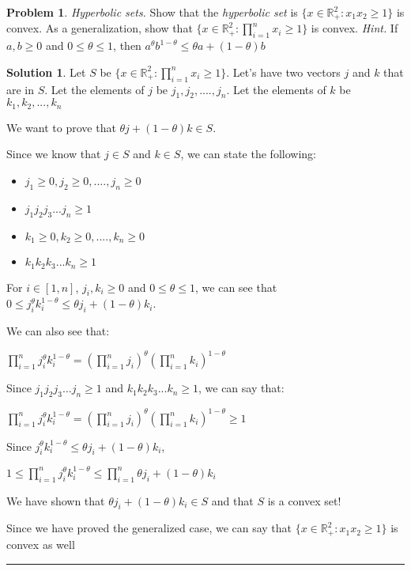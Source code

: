 \documentclass{article}
\theoremstyle{definition}
\newtheorem{problem}{Problem}
\def\fline{\rule{0.75\linewidth}{0.5pt}}
\newcommand{\finishline}{\begin{center}\fline\end{center}}
\newtheorem*{solution*}{Solution}
\newenvironment{solution}{\begin{solution*}}{{\finishline} \end{solution*}}
\begin{document}
\begin{problem}
    \textit{Hyperbolic sets.} Show that the \textit{hyperbolic set} is $\{x \in \mathbb{R}^2_+ : x_1x_2 \geq 1\}$ is convex. As a generalization, show that $\{x \in \mathbb{R}^2_+ : \prod_{i=1}^{n} x_i \geq 1\}$ is convex. \textit{Hint.} If $a, b \geq 0$ and $0 \leq \theta \leq 1$, then $a^{\theta} b^{1 - \theta} \leq \theta a + (1 - \theta) b$

    \begin{solution}
    Let $S$ be $\{x \in \mathbb{R}^2_+ : \prod_{i=1}^{n} x_i \geq 1\}$. Let's have two vectors  $j$ and $k$ that are in $S$. Let the elements of $j$ be $j_1, j_2, ...., j_n$. Let the elements of $k$ be $k_1, k_2, ..., k_n$

        We want to prove that $\theta j + (1 - \theta)k \in S$. 

        Since we know that $j \in S$ and $k \in S$, we can state the following:
        \begin{itemize}
            \item $j_1 \geq 0, j_2 \geq 0, ...., j_n \geq 0$
            \item $j_1 j_2 j_3 ... j_n \geq 1$
            \item $k_1 \geq 0, k_2 \geq 0, ...., k_n \geq 0$
            \item $k_1 k_2 k_3 ... k_n \geq 1$
        \end{itemize}

        For $i \in [1, n]$, $j_i, k_i \geq 0$ and $0 \leq \theta \leq 1$, we can see that $0 \leq j_i^{\theta} k_i^{1 - \theta} \leq \theta j_i + (1 - \theta)k_i$. 

        We can also see that: \newline 
        
        $\prod_{i=1}^{n} j_i^{\theta} k_i^{1 - \theta} =  (\prod_{i=1}^{n} j_i)^{\theta} (\prod_{i=1}^{n} k_i)^{1 - \theta}$

        Since $j_1 j_2 j_3 ... j_n \geq 1$ and $k_1 k_2 k_3 ... k_n \geq 1$, we can say that: \newline 
        
        $\prod_{i=1}^{n} j_i^{\theta} k_i^{1 - \theta} =  (\prod_{i=1}^{n} j_i)^{\theta} (\prod_{i=1}^{n} k_i)^{1 - \theta} \geq 1$

        Since $j_i^{\theta} k_i^{1 - \theta} \leq \theta j_i + (1 - \theta)k_i$, \newline
        
        $1 \leq \prod_{i=1}^{n} j_i^{\theta} k_i^{1 - \theta} \leq   \prod_{i=1}^{n} \theta j_i + (1 - \theta)k_i$

        We have shown that $\theta j_i + (1 - \theta)k_i \in S$ and that $S$ is a convex set!

        Since we have proved the generalized case, we can say that $\{x \in \mathbb{R}^2_+ : x_1x_2 \geq 1\}$ is convex as well 
        
    \end{solution}
\end{problem}
\end{document}
